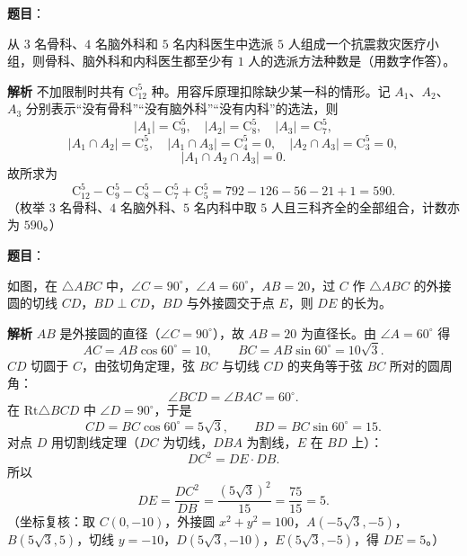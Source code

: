 \begin{answer}

\textbf{题目}：

从 $3$ 名骨科、$4$ 名脑外科和 $5$ 名内科医生中选派 $5$ 人组成一个抗震救灾医疗小组，则骨科、脑外科和内科医生都至少有 $1$ 人的选派方法种数是\gkblank{}（用数字作答）。

\textbf{解析}
不加限制时共有 $\mathrm C_{12}^5$ 种。用容斥原理扣除缺少某一科的情形。记 $A_1$、$A_2$、$A_3$ 分别表示“没有骨科”“没有脑外科”“没有内科”的选法，则
\nopagebreak[4]
\[|A_1|=\mathrm C_9^5,\quad |A_2|=\mathrm C_8^5,\quad |A_3|=\mathrm C_7^5,\]
\nopagebreak[4]
\[|A_1\cap A_2|=\mathrm C_5^5,\quad
|A_1\cap A_3|=\mathrm C_4^5=0,\quad
|A_2\cap A_3|=\mathrm C_3^5=0,\]
\nopagebreak[4]
\[|A_1\cap A_2\cap A_3|=0.\]
故所求为
\nopagebreak[4]
\[\mathrm C_{12}^5-\mathrm C_9^5-\mathrm C_8^5-\mathrm C_7^5+\mathrm C_5^5
=792-126-56-21+1=590.\]
（枚举 $3$ 名骨科、$4$ 名脑外科、$5$ 名内科中取 $5$ 人且三科齐全的全部组合，计数亦为 $590$。）


\end{answer}
\begin{answer}

\textbf{题目}：

如图，在 $\triangle ABC$ 中，$\angle C=90^\circ$，$\angle A=60^\circ$，$AB=20$，过 $C$ 作 $\triangle ABC$ 的外接圆的切线 $CD$，$BD\perp CD$，$BD$ 与外接圆交于点 $E$，则 $DE$ 的长为\gkblank{}。
\nopagebreak[4]
\begin{center}\end{center}
\nopagebreak[4]
\textbf{解析}
$AB$ 是外接圆的直径（$\angle C=90^\circ$），故 $AB=20$ 为直径长。由 $\angle A=60^\circ$ 得
\nopagebreak[4]
\[AC=AB\cos60^\circ=10,\qquad BC=AB\sin60^\circ=10\sqrt3.\]
$CD$ 切圆于 $C$，由弦切角定理，弦 $BC$ 与切线 $CD$ 的夹角等于弦 $BC$ 所对的圆周角：
\nopagebreak[4]
\[\angle BCD=\angle BAC=60^\circ.\]
在 $\mathrm{Rt}\triangle BCD$ 中 $\angle D=90^\circ$，于是
\nopagebreak[4]
\[CD=BC\cos60^\circ=5\sqrt3,\qquad BD=BC\sin60^\circ=15.\]
对点 $D$ 用切割线定理（$DC$ 为切线，$DBA$ 为割线，$E$ 在 $BD$ 上）：
\nopagebreak[4]
\[DC^2=DE\cdot DB.\]
所以
\nopagebreak[4]
\[DE=\frac{DC^2}{DB}=\frac{(5\sqrt3)^2}{15}=\frac{75}{15}=5.\]
（坐标复核：取 $C(0,-10)$，外接圆 $x^2+y^2=100$，$A(-5\sqrt3,-5)$，$B(5\sqrt3,5)$，切线 $y=-10$，$D(5\sqrt3,-10)$，$E(5\sqrt3,-5)$，得 $DE=5$。）


\end{answer}
